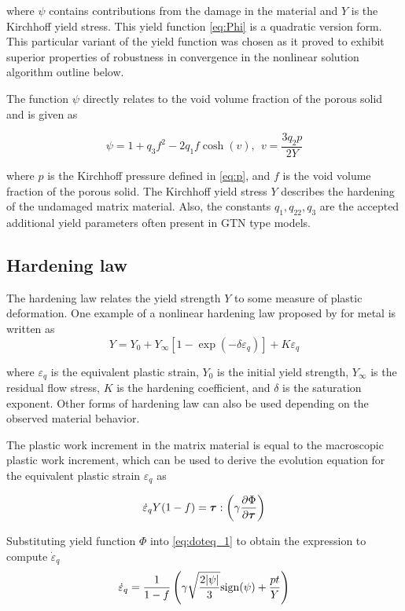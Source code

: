 where $\psi$ contains contributions from the damage in the material
and $Y$ is the Kirchhoff yield stress. This yield function
\eqref{eq:Phi} is a quadratic version form. This particular variant of
the yield function was chosen as it proved to exhibit superior
properties of robustness in convergence in the nonlinear solution
algorithm outline below.

The function $\psi$ directly relates to the void volume fraction of
the porous solid and is given as

\begin{equation}
\psi = 1 + q_3 f^2 - 2 q_1 f \cosh(v), ~~v=\frac{3 q_2 p}{2 Y}
\end{equation}

where $p$ is the Kirchhoff pressure defined in \eqref{eq:p}, and $f$
is the void volume fraction of the porous solid. The Kirchhoff yield
stress $Y$ describes the hardening of the undamaged matrix
material. Also, the constants $q_1,q_22,q_3$ are the accepted
additional yield parameters often present in GTN type models.

\subsection{Hardening law}
The hardening law relates the yield strength $Y$ to some measure of
plastic deformation. One example of a nonlinear hardening law proposed
by \cite{SimoHughes:98} for metal is written as
\begin{equation}
Y = Y_0 + Y_{\infty}\left[ 1-\exp(-\delta\varepsilon_q)\right] +
K\varepsilon_q
\end{equation}

where $\varepsilon_q$ is the equivalent plastic strain, $Y_0$ is the
initial yield strength, $Y_{\infty}$ is the residual flow stress, $K$
is the hardening coefficient, and $\delta$ is the saturation
exponent. Other forms of hardening law can also be used depending on
the observed material behavior.

The plastic work increment in the matrix material is equal to the
macroscopic plastic work increment, which can be used to derive the
evolution equation for the equivalent plastic strain $\varepsilon_q$
as

\begin{equation}\label{eq:doteq_1}
\dot{\varepsilon}_q Y(1-f) = {\boldsymbol{\tau}} : \left(
\gamma\frac{\partial\Phi}{\partial{\boldsymbol{\tau}}} \right)
\end{equation}

Substituting yield function $\Phi$ into \eqref{eq:doteq_1} to obtain
the expression to compute $\dot{\varepsilon}_q$
\begin{equation}\label{eq:doteq}
  \dot{\varepsilon}_q =\frac{1}{1-f}\left(
  \gamma\sqrt{\frac{2|\psi|}{3}} {\rm sign}(\psi) + \frac{p t}{Y}
  \right)
\end{equation}

